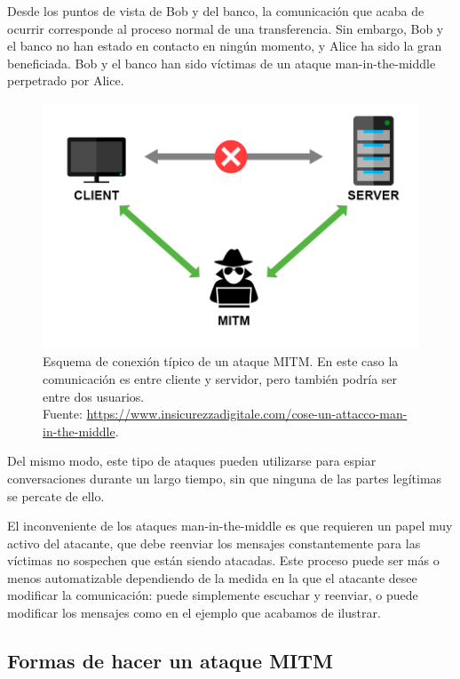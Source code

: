 \documentclass[11pt]{article}
\begin{document}
 Desde los puntos de vista de Bob y del banco, la comunicación que acaba de ocurrir corresponde al proceso normal de una transferencia. Sin embargo,
 Bob y el banco no han estado en contacto en ningún momento, y Alice ha sido la gran beneficiada. 
 Bob y el banco han sido víctimas de un ataque man-in-the-middle perpetrado por Alice.
 
 \begin{figure}[H]
 	\centering
 	\includegraphics[width=120mm]{images/memoir/mitm}
 	\caption{Esquema de conexión típico de un ataque MITM. En este caso la comunicación es entre cliente y servidor, pero también podría
 		ser entre dos usuarios. \\ Fuente: \href{https://www.insicurezzadigitale.com/cose-un-attacco-man-in-the-middle}{https://www.insicurezzadigitale.com/cose-un-attacco-man-in-the-middle}.}
 \end{figure}
 
 Del mismo modo, este tipo de ataques pueden utilizarse para espiar conversaciones durante un largo tiempo, sin que ninguna de las partes legítimas
 se percate de ello.
 
 El inconveniente de los ataques man-in-the-middle es que requieren un papel muy activo del atacante, que debe reenviar los mensajes constantemente
 para las víctimas no sospechen que están siendo atacadas. Este proceso puede ser más o menos automatizable dependiendo de la medida en la que el
 atacante desee modificar la comunicación: puede simplemente escuchar y reenviar, o puede modificar los mensajes como en el ejemplo que acabamos
 de ilustrar.
 
 \subsection{Formas de hacer un ataque MITM}
 
\end{document}
